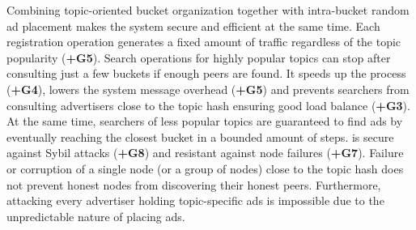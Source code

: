 
Combining topic-oriented bucket organization together with intra-bucket random ad placement makes the system secure and efficient at the same time. 
Each registration operation generates a fixed amount of traffic regardless of the topic popularity (\textbf{+G5}). 
Search operations for highly popular topics can stop after consulting just a few buckets if enough peers are found. 
It speeds up the process (\textbf{+G4}), lowers the system message overhead (\textbf{+G5}) and prevents searchers from consulting advertisers close to the topic hash ensuring good load balance (\textbf{+G3}). 
At the same time, searchers of less popular topics are guaranteed to find ads by eventually reaching the closest bucket in a bounded amount of steps. 
\sysname is secure against Sybil attacks (\textbf{+G8})
and resistant against node failures (\textbf{+G7}). Failure or corruption of a single node (or a group of nodes) close to the topic hash does not prevent honest nodes from discovering their honest peers. 
Furthermore, attacking every advertiser holding topic-specific ads is impossible due to the unpredictable nature of placing ads. 

